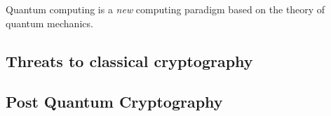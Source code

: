 Quantum computing is a \textit{new} computing paradigm based on the theory of quantum mechanics.
\subsection{Threats to classical cryptography}
\subsection{Post Quantum Cryptography}